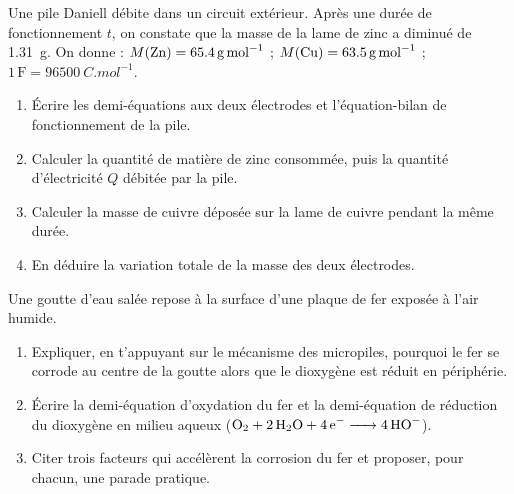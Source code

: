 \documentclass[11pt]{article}
\newcounter{popsec}
\newcounter{popsub}
\newcommand{\courssub}[1]{%
  \stepcounter{popsub}%
  \par\vspace{9pt}\noindent{\popxbold\fontsize{11.5}{13}\selectfont\color{popink}{\color{poporange}\thepopsec.\thepopsub}\hspace{6pt}#1}\par\nopagebreak\vspace{4pt}
}
\begin{document}
\begin{exercice}
Une pile Daniell débite dans un circuit extérieur. Après une durée de fonctionnement $t$, on constate que la masse de la lame de zinc a diminué de \SI{1,31}{g}. On donne : $M(\ce{Zn}) = \SI{65,4}{g.mol^{-1}}$ ; $M(\ce{Cu}) = \SI{63,5}{g.mol^{-1}}$ ; $1\,\mathrm{F} = \SI{96500}{C.mol^{-1}}$.
\begin{enumerate}
\item Écrire les demi-équations aux deux électrodes et l'équation-bilan de fonctionnement de la pile.
\item Calculer la quantité de matière de zinc consommée, puis la quantité d'électricité $Q$ débitée par la pile.
\item Calculer la masse de cuivre déposée sur la lame de cuivre pendant la même durée.
\item En déduire la variation totale de la masse des deux électrodes.
\end{enumerate}
\end{exercice}

\begin{exercice}
Une goutte d'eau salée repose à la surface d'une plaque de fer exposée à l'air humide.
\begin{enumerate}
\item Expliquer, en t'appuyant sur le mécanisme des micropiles, pourquoi le fer se corrode au centre de la goutte alors que le dioxygène est réduit en périphérie.
\item Écrire la demi-équation d'oxydation du fer et la demi-équation de réduction du dioxygène en milieu aqueux ($\ce{O2} + \ce{2H2O} + \ce{4e-} \ce{->} \ce{4HO-}$).
\item Citer trois facteurs qui accélèrent la corrosion du fer et proposer, pour chacun, une parade pratique.
\end{enumerate}
\end{exercice}

\courssub{Je me prépare au Bac}
\end{document}
